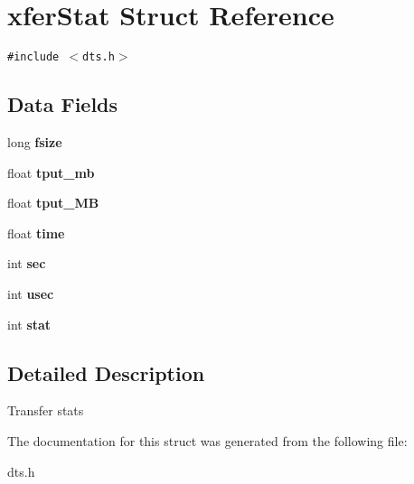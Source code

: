 \hypertarget{structxferStat}{
\section{xferStat Struct Reference}
\label{structxferStat}
}
{\tt \#include $<$dts.h$>$}

\subsection*{Data Fields}
\begin{CompactItemize}
\item 
\hypertarget{structxferStat_8a10097720b102b6fa48a6e485bda294}{
long \textbf{fsize}}
\label{structxferStat_8a10097720b102b6fa48a6e485bda294}

\item 
\hypertarget{structxferStat_edd6fa7f91f37d3e459ef9c95e30c27b}{
float \textbf{tput\_\-mb}}
\label{structxferStat_edd6fa7f91f37d3e459ef9c95e30c27b}

\item 
\hypertarget{structxferStat_ae9c832b6ada200ad451748110ce1e65}{
float \textbf{tput\_\-MB}}
\label{structxferStat_ae9c832b6ada200ad451748110ce1e65}

\item 
\hypertarget{structxferStat_ada022ed349fc5c41fda8d592e2a70ee}{
float \textbf{time}}
\label{structxferStat_ada022ed349fc5c41fda8d592e2a70ee}

\item 
\hypertarget{structxferStat_0958d2061b1c7f427a39f44645b48807}{
int \textbf{sec}}
\label{structxferStat_0958d2061b1c7f427a39f44645b48807}

\item 
\hypertarget{structxferStat_0c1b1a6cac77912a42313f02fa0b15a6}{
int \textbf{usec}}
\label{structxferStat_0c1b1a6cac77912a42313f02fa0b15a6}

\item 
\hypertarget{structxferStat_73a163cec5d228263c1459cdccb917e8}{
int \textbf{stat}}
\label{structxferStat_73a163cec5d228263c1459cdccb917e8}

\end{CompactItemize}


\subsection{Detailed Description}
Transfer stats 

The documentation for this struct was generated from the following file:\begin{CompactItemize}
\item 
dts.h\end{CompactItemize}
